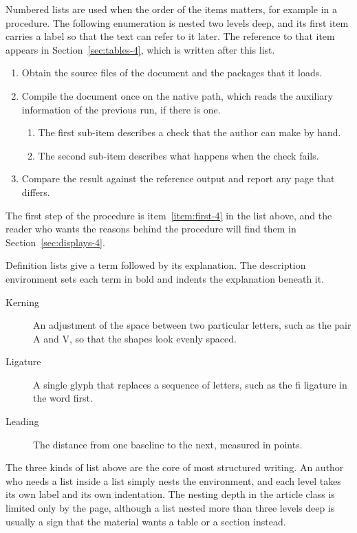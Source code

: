 \documentclass{article}
\begin{document}
Numbered lists are used when the order of the items matters, for example in a
procedure. The following enumeration is nested two levels deep, and its first item
carries a label so that the text can refer to it later. The reference to that item
appears in Section~\ref{sec:tables-4}, which is written after this list.

\begin{enumerate}
  \item\label{item:first-4} Obtain the source files of the document and the packages that
        it loads.
  \item Compile the document once on the native path, which reads the auxiliary
        information of the previous run, if there is one.
        \begin{enumerate}
          \item The first sub-item describes a check that the author can make by hand.
          \item The second sub-item describes what happens when the check fails.
        \end{enumerate}
  \item Compare the result against the reference output and report any page that
        differs.
\end{enumerate}

The first step of the procedure is item~\ref{item:first-4} in the list above, and the
reader who wants the reasons behind the procedure will find them in
Section~\ref{sec:displays-4}.

Definition lists give a term followed by its explanation. The description environment
sets each term in bold and indents the explanation beneath it.

\begin{description}
  \item[Kerning] An adjustment of the space between two particular letters, such as
        the pair A and V, so that the shapes look evenly spaced.
  \item[Ligature] A single glyph that replaces a sequence of letters, such as the
        fi ligature in the word first.
  \item[Leading] The distance from one baseline to the next, measured in points.
\end{description}

The three kinds of list above are the core of most structured writing. An author who
needs a list inside a list simply nests the environment, and each level takes its own
label and its own indentation. The nesting depth in the article class is limited only
by the page, although a list nested more than three levels deep is usually a sign that
the material wants a table or a section instead.
\end{document}
